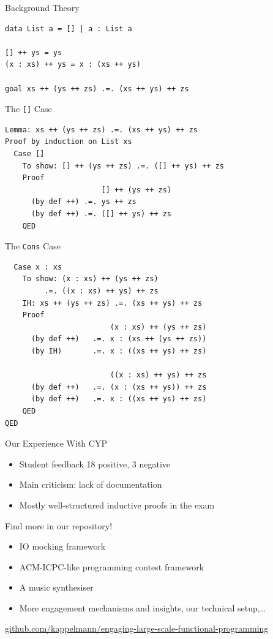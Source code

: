 \documentclass{beamer}
\begin{document}
\begin{frame}[fragile]{Background Theory}
\lstset{language=CYP}
  \begin{lstlisting}
data List a = [] | a : List a

[] ++ ys = ys
(x : xs) ++ ys = x : (xs ++ ys)

goal xs ++ (ys ++ zs) .=. (xs ++ ys) ++ zs
  \end{lstlisting}
\end{frame}

\begin{frame}[fragile]{The \texttt{[]} Case}
  \begin{lstlisting}
Lemma: xs ++ (ys ++ zs) .=. (xs ++ ys) ++ zs
Proof by induction on List xs
  Case []
    To show: [] ++ (ys ++ zs) .=. ([] ++ ys) ++ zs
    Proof
                      [] ++ (ys ++ zs)
      (by def ++) .=. ys ++ zs
      (by def ++) .=. ([] ++ ys) ++ zs
    QED
  \end{lstlisting}
\end{frame}

\begin{frame}[fragile]{The \texttt{Cons} Case}
  \begin{lstlisting}
  Case x : xs
    To show: (x : xs) ++ (ys ++ zs)
         .=. ((x : xs) ++ ys) ++ zs
    IH: xs ++ (ys ++ zs) .=. (xs ++ ys) ++ zs
    Proof
                        (x : xs) ++ (ys ++ zs)
      (by def ++)   .=. x : (xs ++ (ys ++ zs))
      (by IH)       .=. x : ((xs ++ ys) ++ zs)

                        ((x : xs) ++ ys) ++ zs
      (by def ++)   .=. (x : (xs ++ ys)) ++ zs
      (by def ++)   .=. x : ((xs ++ ys) ++ zs)
    QED
QED
  \end{lstlisting}
\end{frame}

\begin{frame}{Our Experience With CYP}
\begin{itemize}[<+->]
  \item Student feedback 18 positive, 3 negative
  \item Main criticism: lack of documentation
  \item Mostly well-structured inductive proofs in the exam
\end{itemize}
\end{frame}


\begin{frame}
\centerline{\alert{\huge{Find more in our repository!}}}
\begin{itemize}
\item IO mocking framework
\item ACM-ICPC-like programming contest framework
\item A music synthesiser
\item More engagement mechanisms and insights, our technical setup,\dots
\end{itemize}

\vspace{\baselineskip}
\centerline{\small\url{github.com/kappelmann/engaging-large-scale-functional-programming}}
\end{frame}
\end{document}
